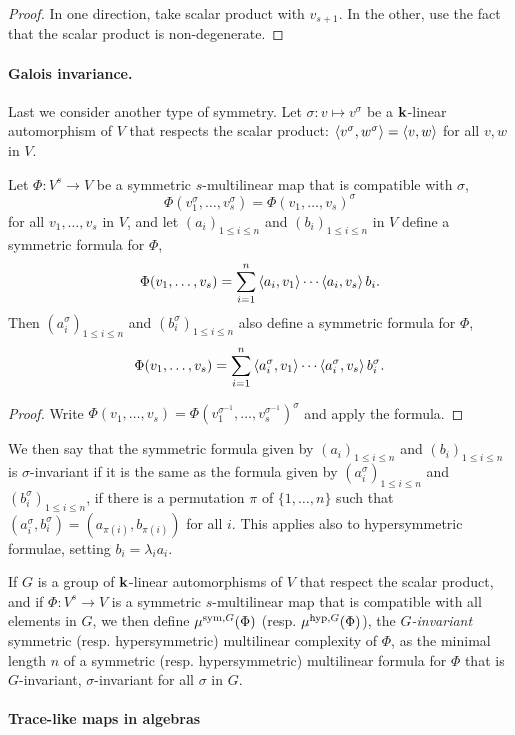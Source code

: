 \documentclass[11pt]{article}
\begin{document}
\begin{proof}
In one direction, take scalar product with $v_{s+1}$. In the other, use the fact that the scalar product is non-degenerate.
\end{proof}

\paragraph{Galois invariance.}
Last we consider another type of symmetry.
Let $\sigma:v\mapsto v^\sigma$ be a $\mathbf{k}$-linear automorphism of $V$
that respects the scalar product: $\left\langle v^\sigma,w^\sigma\right\rangle=\left\langle v,w\right\rangle$ for all $v,w$ in $V$.
\begin{lm}
Let $\Phi:V^s\to V$ be a symmetric $s$-multilinear map that is compatible with $\sigma$, \ie
\[
\Phi(v_1^\sigma,\dots,v_s^\sigma)=\Phi(v_1,\dots,v_s)^\sigma
\]
for all $v_1,\dots,v_s$ in $V$,
and let $(a_i)_{1\leq i\leq n}$ and $(b_i)_{1\leq i\leq n}$ in $V$ define a symmetric formula for $\Phi$,
\[
\Phi(v_1,\dots,v_s)=\sum_{i=1}^{n}\left\langle a_i,v_1\right\rangle\cdots\left\langle a_i,v_s\right\rangle b_i.
\]
Then $(a_i^\sigma)_{1\leq i\leq n}$ and $(b_i^\sigma)_{1\leq i\leq n}$ also define a symmetric formula for $\Phi$,
\[
\Phi(v_1,\dots,v_s)=\sum_{i=1}^{n}\left\langle a_i^\sigma,v_1\right\rangle\cdots\left\langle a_i^\sigma,v_s\right\rangle b_i^\sigma.
\]
\end{lm}
\begin{proof}
Write $\Phi(v_1,\dots,v_s)=\Phi(v_1^{\sigma^{-1}},\dots,v_s^{\sigma^{-1}})^\sigma$ and apply the formula.
\end{proof}
We then say that the symmetric formula given by $(a_i)_{1\leq i\leq n}$ and $(b_i)_{1\leq i\leq n}$ is $\sigma$-invariant if it is the same as the formula given by $(a_i^\sigma)_{1\leq i\leq n}$ and $(b_i^\sigma)_{1\leq i\leq n}$,
\ie if there is a permutation $\pi$ of $\{1,\dots,n\}$ such that $(a_i^\sigma,b_i^\sigma)=(a_{\pi(i)},b_{\pi(i)})$ for all $i$. This applies also to hypersymmetric formulae, setting $b_i=\lambda_i a_i$.

If $G$ is a group of $\mathbf{k}$-linear automorphisms of $V$
that respect the scalar product, and if $\Phi:V^s\to V$ is a symmetric $s$-multilinear map that is compatible with all elements in $G$,
we then define $\mu^{\textrm{sym},G}(\Phi)$ (resp. $\mu^{\textrm{hyp},G}(\Phi)$),
the \emph{$G$-invariant} symmetric (resp. hypersymmetric) multilinear complexity of $\Phi$,
as the minimal length $n$ of a symmetric (resp. hypersymmetric) multilinear formula for $\Phi$ that is $G$-invariant, \ie $\sigma$-invariant for all $\sigma$ in $G$. 


\paragraph{Trace-like maps in algebras}
\end{document}
